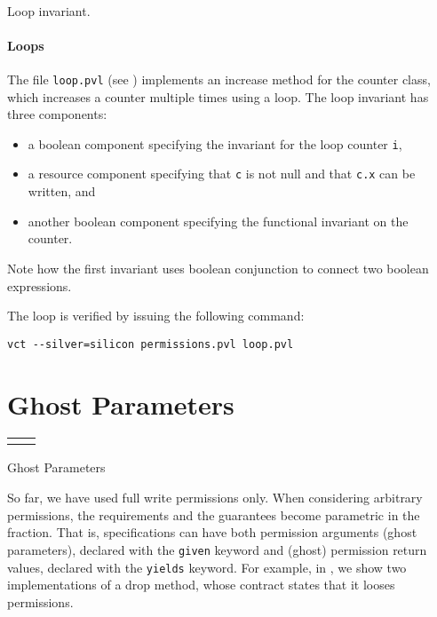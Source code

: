\begin{listing}
 
\caption{Loop invariant.}
\label{loop invariant}
\end{listing}
\paragraph{Loops}
The file \verb+loop.pvl+ (see ) implements 
an increase method for the counter class, which increases a counter multiple times using a loop.
The loop invariant has three components: 
\begin{itemize}
\item a boolean component specifying the invariant
for the loop counter \lstinline+i+, 
\item a resource component specifying that \lstinline+c+ is not null and that \lstinline+c.x+ can be written, and
\item another boolean component specifying the functional invariant on
  the counter.
\end{itemize}
Note how the first invariant uses boolean conjunction to connect two boolean expressions.

The loop is verified by issuing the following command:
\begin{verbatim}
vct --silver=silicon permissions.pvl loop.pvl 
\end{verbatim}

\section{Ghost Parameters}

\begin{listing}
\begin{tabular}{l@{~~~~~}l}

&

\end{tabular}
\caption{Ghost Parameters}
\label{ghost parameters}
\end{listing}


So far, we have used full write permissions only.
When considering arbitrary permissions, the requirements
and the guarantees become parametric in 
the fraction. That is, specifications can have both permission
arguments (ghost parameters), declared with the \lstinline+given+
keyword and (ghost) permission return values, declared with the \lstinline+yields+
keyword. For example, in , we show
two implementations of a drop method, whose contract states that
it looses permissions.

